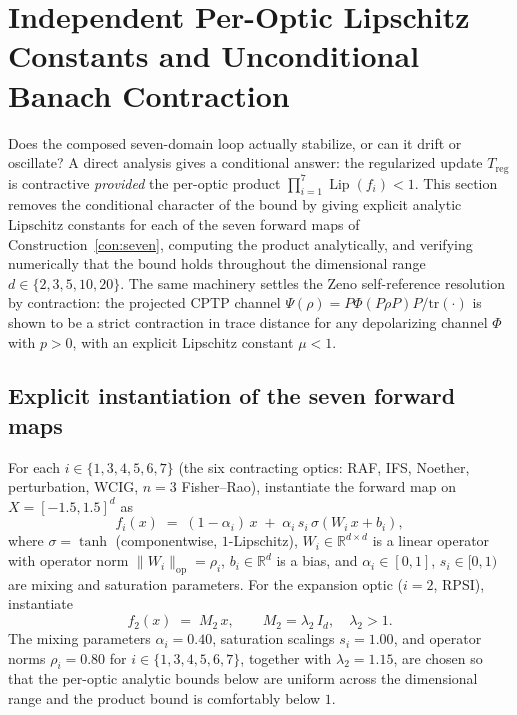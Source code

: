 \documentclass[11pt,a4paper]{article}
\theoremstyle{plain}
\theoremstyle{definition}
\theoremstyle{remark}
\newcommand{\RR}{\mathbb{R}}
\DeclareMathOperator{\Lip}{Lip}
\begin{document}

\section{Independent Per-Optic Lipschitz Constants and Unconditional Banach Contraction}\label{sec:lipschitz}

Does the composed seven-domain loop actually stabilize, or can it
drift or oscillate? A direct analysis gives a conditional answer: the
regularized update $T_{\mathrm{reg}}$ is contractive \emph{provided}
the per-optic product $\prod_{i=1}^{7}\Lip(f_{i})<1$. This section
removes the conditional character of the bound by giving explicit
analytic Lipschitz constants for each of the seven forward maps of
Construction~\ref{con:seven}, computing the product analytically, and
verifying numerically that the bound holds throughout the dimensional
range $d\in\{2,3,5,10,20\}$. The same machinery settles
the Zeno self-reference resolution by
contraction: the projected CPTP channel
$\Psi(\rho)=P\Phi(P\rho P)P/\mathrm{tr}(\cdot)$ is shown to be a strict
contraction in trace distance for any depolarizing channel $\Phi$ with
$p>0$, with an explicit Lipschitz constant $\mu<1$.

\subsection{Explicit instantiation of the seven forward maps}

For each $i\in\{1,3,4,5,6,7\}$ (the six contracting optics: RAF, IFS,
Noether, perturbation, WCIG, $n=3$ Fisher--Rao), instantiate the
forward map on $X=[-1.5,1.5]^{d}$ as
\begin{equation}\label{eq:fi-contracting}
  f_{i}(x) \;=\; (1-\alpha_{i})\,x \;+\; \alpha_{i}\,s_{i}\,\sigma(W_{i}\,x+b_{i}),
\end{equation}
where $\sigma=\tanh$ (componentwise, $1$-Lipschitz), $W_{i}\in\RR^{d\times
d}$ is a linear operator with operator norm $\|W_{i}\|_{\mathrm{op}}=\rho_{i}$,
$b_{i}\in\RR^{d}$ is a bias, and $\alpha_{i}\in[0,1]$, $s_{i}\in[0,1)$
are mixing and saturation parameters. For the expansion optic
($i=2$, RPSI), instantiate
\begin{equation}\label{eq:f2-expansion}
  f_{2}(x) \;=\; M_{2}\,x,\qquad M_{2}=\lambda_{2}\,I_{d},\quad \lambda_{2}>1.
\end{equation}
The mixing parameters $\alpha_{i}=0.40$, saturation scalings
$s_{i}=1.00$, and operator norms $\rho_{i}=0.80$ for $i\in
\{1,3,4,5,6,7\}$, together with $\lambda_{2}=1.15$, are chosen so
that the per-optic analytic bounds below are uniform across the
dimensional range and the product bound is comfortably below $1$.
\end{document}
